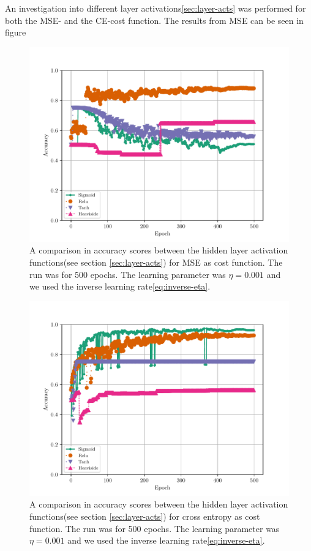 An investigation into different layer activations\ref{sec:layer-acts} was performed for both the MSE- and the CE-cost function. The results from MSE can be seen in figure 
\begin{figure}[H]
    \centering
    \includegraphics[scale=1.0]{../fig/mlp_epoch_activations_mse.pdf}
    \caption{A comparison in accuracy scores between the hidden layer activation functions(see section \ref{sec:layer-acts}) for MSE as cost function. The run was for 500 epochs. The learning parameter was $\eta=0.001$ and we used the inverse learning rate\eqref{eq:inverse-eta}.}
    \label{fig:mlp-epoch-activations-mse}
\end{figure}
\begin{figure}[H]
    \centering
    \includegraphics[scale=1.0]{../fig/mlp_epoch_activations_log_loss.pdf}
    \caption{A comparison in accuracy scores between the hidden layer activation functions(see section \ref{sec:layer-acts}) for cross entropy as cost function. The run was for 500 epochs. The learning parameter was $\eta=0.001$ and we used the inverse learning rate\eqref{eq:inverse-eta}.}
    \label{fig:mlp-epoch-activations-log-loss}
\end{figure}

